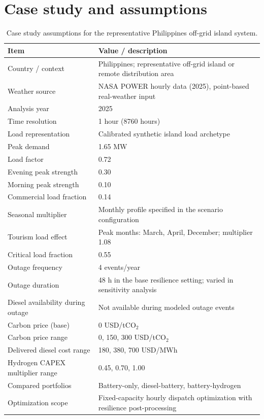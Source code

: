 \documentclass[preprint,12pt]{elsarticle}
\begin{document}
\section{Case study and assumptions}
\begin{table}[H]
\centering
\caption{Case study assumptions for the representative Philippines off-grid island system.}
\label{tab:assumptions}
\begin{tabular}{p{5.2cm} p{8.8cm}}
\toprule
Item & Value / description \\
\midrule
Country / context & Philippines; representative off-grid island or remote distribution area \\
Weather source & NASA POWER hourly data (2025), point-based real-weather input \\
Analysis year & 2025 \\
Time resolution & 1 hour (8760 hours) \\
Load representation & Calibrated synthetic island load archetype \\
Peak demand & 1.65 MW \\
Load factor & 0.72 \\
Evening peak strength & 0.30 \\
Morning peak strength & 0.10 \\
Commercial load fraction & 0.14 \\
Seasonal multiplier & Monthly profile specified in the scenario configuration \\
Tourism load effect & Peak months: March, April, December; multiplier 1.08 \\
Critical load fraction & 0.55 \\
Outage frequency & 4 events/year \\
Outage duration & 48 h in the base resilience setting; varied in sensitivity analysis \\
Diesel availability during outage & Not available during modeled outage events \\
Carbon price (base) & 0 USD/tCO$_2$ \\
Carbon price range & 0, 150, 300 USD/tCO$_2$ \\
Delivered diesel cost range & 180, 380, 700 USD/MWh \\
Hydrogen CAPEX multiplier range & 0.45, 0.70, 1.00 \\
Compared portfolios & Battery-only, diesel-battery, battery-hydrogen \\
Optimization scope & Fixed-capacity hourly dispatch optimization with resilience post-processing \\
\bottomrule
\end{tabular}
\end{table}
\end{document}
